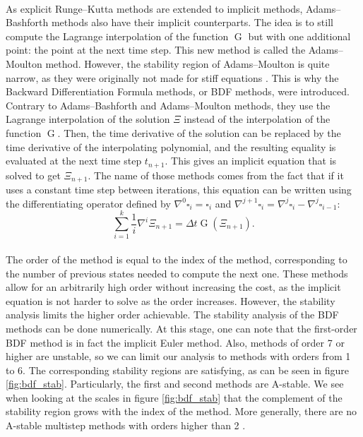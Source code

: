         \paragraph{}
        As explicit Runge--Kutta methods are extended to implicit methods, Adams--Bashforth methods also have their implicit counterparts.
        The idea is to still compute the Lagrange interpolation of the function $\operatorname{G}$ but with one additional point: the point at the next time step.
        This new method is called the Adams--Moulton method.
        However, the stability region of Adams--Moulton is quite narrow, as they were originally not made for stiff equations \cite{Iserles2008}.
        This is why the Backward Differentiation Formula methods, or BDF methods, were introduced.
        Contrary to Adams--Bashforth and Adams--Moulton methods, they use the Lagrange interpolation of the solution $\Xi$ instead of the interpolation of the function $\operatorname{G}$.
        Then, the time derivative of the solution can be replaced by the time derivative of the interpolating polynomial, and the resulting equality is evaluated at the next time step $t_{n+1}$.
        This gives an implicit equation that is solved to get $\Xi_{n+1}$.
        The name of those methods comes from the fact that if it uses a constant time step between iterations, this equation can be written using the differentiating operator defined by $\nabla^0 \square_i = \square_i$ and $\nabla^{j+1} \square_i = \nabla^j \square_i - \nabla^j \square_{i-1}$:
        \begin{equation}
          \sum_{i=1}^k \frac{1}{i} \nabla^i \Xi_{n+1} = \Delta t \operatorname{G}\left(\Xi_{n+1}\right) .
        \end{equation}

        \paragraph{}
        The order of the method is equal to the index of the method, corresponding to the number of previous states needed to compute the next one.
        These methods allow for an arbitrarily high order without increasing the cost, as the implicit equation is not harder to solve as the order increases.
        However, the stability analysis limits the higher order achievable.
        The stability analysis of the BDF methods can be done numerically.
        At this stage, one can note that the first-order BDF method is in fact the implicit Euler method.
        Also, methods of order 7 or higher are unstable, so we can limit our analysis to methods with orders from 1 to 6.
        The corresponding stability regions are satisfying, as can be seen in figure \ref{fig:bdf_stab}.
        Particularly, the first and second methods are A-stable.
        We see when looking at the scales in figure \ref{fig:bdf_stab} that the complement of the stability region grows with the index of the method.
        More generally, there are no A-stable multistep methods with orders higher than 2 \cite{Dahlquist1963, HairerWanner1996}.

